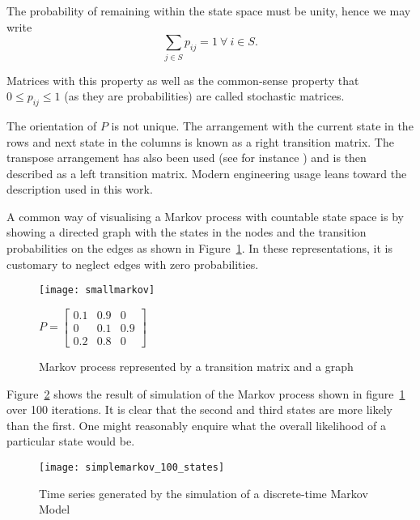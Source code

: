 The probability of remaining within the state space must be unity,
hence we may write 
\begin{equation}
  \label{eq:rowsumone}
  \sum_{j\in S} p_{ij}=1~\forall~i \in S.
\end{equation}

Matrices with this property as well as the common-sense property
that $0 \leq p_{ij} \leq 1$ (as they are probabilities) are called
stochastic matrices.

The orientation of $P$ is not unique. The arrangement with the current
state in the rows and next state in the columns is known as a right
transition matrix. The transpose arrangement has also been used (see
for instance \citet{bhar.hamori2004hidden}) and is then described as a left
transition matrix. Modern engineering usage leans toward the
description used in this work.

A common way of visualising a Markov process with countable state
space is by showing a directed graph with the states in the nodes and
the transition probabilities on the edges as shown in
Figure~\ref{fig:markovgraph}. In these representations, it is
customary to neglect edges with zero probabilities.

\begin{figure}[htbp]
  \centering
  \begin{minipage}{0.4\textwidth}
    \texttt{[image: smallmarkov]}
  \end{minipage}
  \begin{minipage}{0.4\textwidth}
   $\displaystyle P = \left [ 
      \begin{array}{ccc} 
        0.1 & 0.9 & 0 \\ 
        0 & 0.1 & 0.9 \\ 
        0.2 & 0.8 & 0 
      \end{array} \right ]$
  \end{minipage}
  \caption{Markov process represented by a transition matrix and a graph}
  \label{fig:markovgraph}
\end{figure}

Figure~\ref{fig:markovtimeseries} shows the result of simulation of the Markov process shown in figure~\ref{fig:markovgraph} over 100 iterations.  
It is clear that the second and third states are more likely than the first.
One might reasonably enquire what the overall likelihood of a particular state would be. 

\begin{figure}[htbp]
  \centering
  \texttt{[image: simplemarkov\_100\_states]}
  \caption{Time series generated by the simulation of a discrete-time Markov Model}
  \label{fig:markovtimeseries}
\end{figure}

